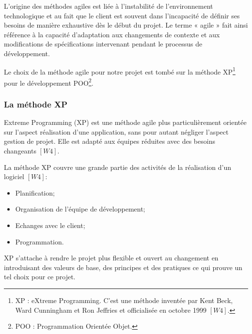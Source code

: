 \vspace{6pt}
\paragraphmark

L’origine des méthodes agiles est liée à l’instabilité de l’environnement technologique et au fait que le client est souvent dans l’incapacité de définir ses besoins de manière exhaustive dès le début du projet. Le terme « agile » fait ainsi référence à la capacité d’adaptation aux changements de contexte et aux modifications de spécifications intervenant pendant le processus de développement.

\vspace{6pt}
\paragraphmark

Le choix de la méthode agile pour notre projet est tombé sur la méthode XP\footnote{XP : eXtreme Programming. C'est une méthode inventée par Kent Beck, Ward Cunningham et Ron Jeffries et officialisée en octobre 1999 $[W4]$.} pour le développement POO\footnote{POO : Programmation Orientée Objet.}.

\subsubsection{La méthode XP}

Extreme Programming (XP) est une méthode agile plus particulièrement orientée sur l'aspect réalisation d'une application, sans pour autant négliger l'aspect gestion de projet. Elle est adapté aux équipes réduites avec des besoins changeants $[W4]$.

\vspace{6pt}
\paragraphmark

La méthode XP couvre une grande partie des activités de la réalisation d’un logiciel $[W4]$:

\vspace{6pt}
\paragraphmark

\begin{itemize}
	\item Planification;
	\item Organisation de l’équipe de développement;
	\item Echanges avec le client;
	\item Programmation.
\end{itemize}

\vspace{6pt}
\paragraphmark

XP s'attache à rendre le projet plus flexible et ouvert au changement en introduisant des valeurs de base, des principes et des pratiques ce qui prouve un tel choix pour ce projet.

